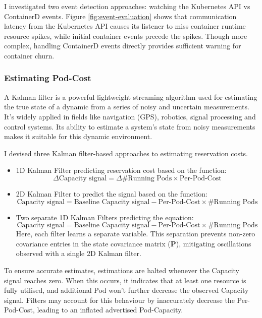 I investigated two event detection approaches: watching the Kubernetes API vs
ContainerD events. Figure \ref{fig:event-evaluation} shows that communication
latency from the Kubernetes API causes its listener to miss container runtime
resource spikes, while initial container events precede the spikes. Though more
complex, handling ContainerD events directly provides sufficient warning for
container churn.

\subsubsection{Estimating Pod-Cost}
\label{sec:estimating-cost}
A Kalman filter \cite{} is a powerful lightweight streaming algorithm used for
estimating the true state of a dynamic from a series of noisy and uncertain
measurements. It's widely applied in fields like navigation (GPS), robotics,
signal processing and control systems. Its ability to estimate a system's state
from noisy measurements makes it suitable for this dynamic environment.

I devised three Kalman filter-based approaches to estimating reservation costs.
\begin{itemize}
    \item 1D Kalman Filter predicting reservation cost based on the function:
        \[\Delta \text{Capacity signal} = \Delta \text{\# Running Pods} \times
        \text{Per-Pod-Cost}\]
    \item 2D Kalman Filter to predict the signal based on the function:
        \[\text{Capacity signal} = \text{Baseline Capacity signal} - \text{Per-Pod-Cost}
        \times \text{\# Running Pods}\]
    \item Two separate 1D Kalman Filters predicting the equation:
        \[\text{Capacity signal} = \text{Baseline Capacity signal} -
        \text{Per-Pod-Cost} \times \text{\# Running Pods}\]
        Here, each filter learns a separate variable. This separation prevents
        non-zero covariance entries in the state covariance matrix ($\mathbf{P}$),
        mitigating oscillations observed with a single 2D Kalman filter.
\end{itemize}
To ensure accurate estimates, estimations are halted whenever the Capacity signal
reaches zero. When this occurs, it indicates that at least one resource is fully
utilised, and additional Pod won't further decrease the observed Capacity
signal. Filters may account for this behaviour by inaccurately decrease the
Per-Pod-Cost, leading to an inflated advertised Pod-Capacity.

